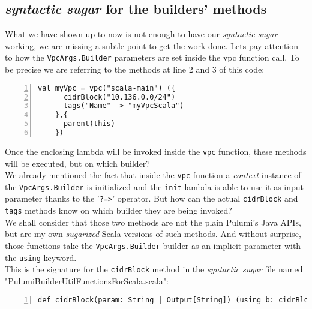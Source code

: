 \subsection{\textit{syntactic sugar} for the builders' methods}
\label{ssec:syn-sug-builders}
What we have shown up to now is not enough to have our \textit{syntactic sugar} working, we are missing a subtle point to get the work done.
Lets pay attention to how the \texttt{VpcArgs.Builder} parameters are set inside the vpc function call.
To be precise we are referring to the methods at line 2 and 3 of this code:\\
\begin{minipage}{\linewidth}
  \begin{lstlisting}[numbers=left, numberstyle=\tiny, numbersep=-5pt, stepnumber=1]
    val myVpc = vpc("scala-main") ({
      cidrBlock("10.136.0.0/24")
      tags("Name" -> "myVpcScala")
    },{
      parent(this)
    })
  \end{lstlisting}
\end{minipage}
Once the enclosing lambda will be invoked inside the \texttt{vpc} function, these methods will be executed, but on which builder?\\
We already mentioned the fact that inside the \texttt{vpc} function a \textit{context} instance of the \texttt{VpcArgs.Builder} is initialized and the \texttt{init} lambda is able to use it as input parameter thanks to the '\texttt{?=>}' operator.
But how can the actual \texttt{cidrBlock} and \texttt{tags} methods know on which builder they are being invoked?\\
We shall consider that those two methods are not the plain Pulumi's Java APIs, but are my own \textit{sugarized} Scala versions of such methods. 
And without surprise, those functions take the \texttt{VpcArgs.Builder} builder as an implicit parameter with the \texttt{using} keyword.\\
This is the signature for the \texttt{cidrBlock} method in the \textit{syntactic sugar} file named "PulumiBuilderUtilFunctionsForScala.scala":\\
\begin{minipage}{\linewidth}
\begin{lstlisting}[numbers=left, numberstyle=\tiny, numbersep=-5pt, stepnumber=1, linewidth=420pt]
  def cidrBlock(param: String | Output[String]) (using b: cidrBlockOwners): Unit
\end{lstlisting}
\end{minipage}
